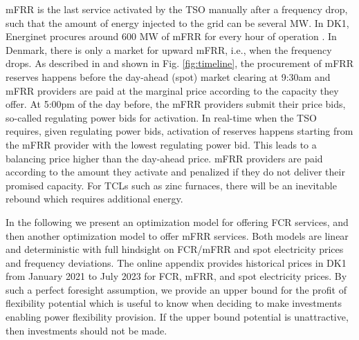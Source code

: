 \documentclass[conference]{IEEEtran}
\begin{document}

mFRR is the last service activated by the TSO manually after a frequency drop, such that the amount of energy injected to the grid can be several MW. In DK1, Energinet procures around 600 MW of mFRR for every hour of operation \cite{energinet:scenario_report_2022}. In Denmark, there is only a market for upward mFRR, i.e., when the frequency drops. 
%
As described in \cite{gade2023load} and shown in Fig. \ref{fig:timeline}, the procurement of mFRR reserves happens before the day-ahead (spot) market clearing at 9:30am and mFRR providers are paid at the marginal price according to the capacity they offer. At 5:00pm of the day before, the mFRR providers submit their price bids, so-called regulating power bids for activation. 
In real-time when the TSO requires, given regulating power bids, activation of reserves happens starting from the mFRR provider with the lowest regulating power bid. This leads to a balancing price higher than the day-ahead price. mFRR providers are paid according to the amount they activate and penalized if they do not deliver their promised capacity. For TCLs such as zinc furnaces, there will be an inevitable rebound which requires additional energy.



In the following we present an optimization model for offering FCR services, and then another optimization model to offer mFRR services.
Both models are linear and deterministic with full hindsight on FCR/mFRR and spot electricity prices and frequency deviations. The online appendix \cite{code} provides historical prices in DK1 from January 2021 to July 2023 for FCR, mFRR, and spot electricity prices. By such a perfect foresight assumption, we provide an upper bound for the profit of flexibility potential which is useful to know when deciding to make investments enabling power flexibility provision. If the upper bound potential is unattractive, then investments should not be made.
\end{document}
